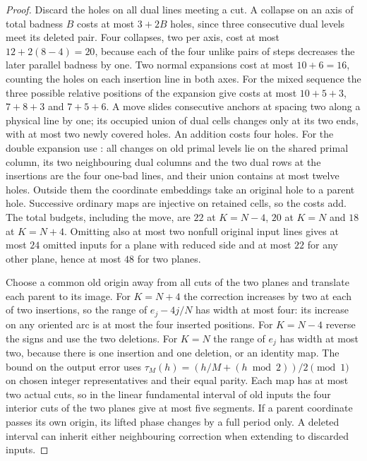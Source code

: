 \documentclass[11pt,colorlinks]{charlie}
\begin{document}
\begin{proof}
Discard the holes on all dual lines meeting a cut. A collapse on an axis of total badness $B$ costs at most $3+2B$ holes, since three consecutive dual levels meet its deleted pair. Four collapses, two per axis, cost at most $12+2(8-4)=20$, because each of the four unlike pairs of steps decreases the later parallel badness by one. Two normal expansions cost at most $10+6=16$, counting the holes on each insertion line in both axes. For the mixed sequence the three possible relative positions of the expansion give costs at most $10+5+3$, $7+8+3$ and $7+5+6$. A move slides consecutive anchors at spacing two along a physical line by one; its occupied union of dual cells changes only at its two ends, with at most two newly covered holes. An addition costs four holes. For the double expansion use : all changes on old primal levels lie on the shared primal column, its two neighbouring dual columns and the two dual rows at the insertions are the four one-bad lines, and their union contains at most twelve holes. Outside them the coordinate embeddings take an original hole to a parent hole. Successive ordinary maps are injective on retained cells, so the costs add. The total budgets, including the move, are $22$ at $K=N-4$, $20$ at $K=N$ and $18$ at $K=N+4$. Omitting also at most two nonfull original input lines gives at most $24$ omitted inputs for a plane with reduced side and at most $22$ for any other plane, hence at most $48$ for two planes.

Choose a common old origin away from all cuts of the two planes and translate each parent to its image. For $K=N+4$ the correction increases by two at each of two insertions, so the range of $e_j-4j/N$ has width at most four: its increase on any oriented arc is at most the four inserted positions. For $K=N-4$ reverse the signs and use the two deletions. For $K=N$ the range of $e_j$ has width at most two, because there is one insertion and one deletion, or an identity map. The bound on the output error uses $\tau_M(h)=(h/M+(h\bmod2))/2\pmod1$ on chosen integer representatives and their equal parity. Each map has at most two actual cuts, so in the linear fundamental interval of old inputs the four interior cuts of the two planes give at most five segments. If a parent coordinate passes its own origin, its lifted phase changes by a full period only. A deleted interval can inherit either neighbouring correction when extending to discarded inputs.
\end{proof}
\end{document}
